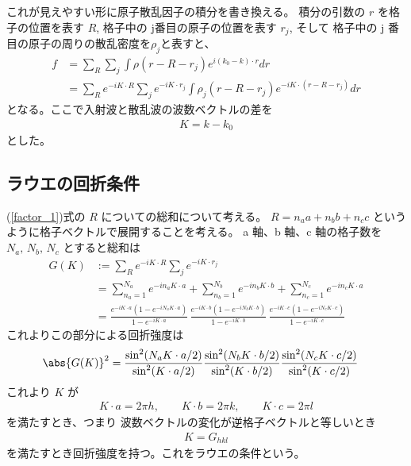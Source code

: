 \documentclass[11pt,dvipdfmx,a4paper]{jsarticle}
\begin{document}
これが見えやすい形に原子散乱因子の積分を書き換える。
積分の引数の \(r\) を格子の位置を表す \(R\), 格子中の j番目の原子の位置を表す \(r_j\), そして
格子中の j 番目の原子の周りの散乱密度を\(\rho_j\)と表すと、
\begin{align}
	f&=\sum_R \sum_{j} \int\rho(r-R-r_j)e^{i(k_0-k)\cdot r} dr\\
	&=\sum_R e^{-iK\cdot R}\sum_j e^{-iK\cdot r_j} \int \rho_j(r-R-r_j) e^{-iK\cdot(r-R-r_j)}dr\label{factor_1}
\end{align}
となる。ここで入射波と散乱波の波数ベクトルの差を
\begin{align}
	K = k -k_0
\end{align}
とした。

\subsection{ラウエの回折条件}
(\ref{factor_1})式の \(R\) についての総和について考える。
\(R = n_a a + n_b b + n_c c\) というように格子ベクトルで展開することを考える。
a 軸、b 軸、c 軸の格子数を\(N_a,\,N_b,\,N_c\) とすると総和は
\begin{align}
	G(K) &:= \sum_R e^{-iK\cdot R}\sum_j e^{-iK\cdot r_j}\\
	&= \sum_{n_a=1}^{N_a} e^{-in_aK\cdot a} + \sum_{n_b=1}^{N_b} e^{-in_bK\cdot b} + \sum_{n_c=1}^{N_c} e^{-in_cK\cdot a}\\
	&=\frac{e^{-iK\cdot a} (1-e^{-iN_a K\cdot a})}{1-e^{-iK\cdot a}}\,
	\frac{e^{-iK\cdot b} (1-e^{-iN_b K\cdot b})}{1-e^{-iK\cdot b}}\,
	\frac{e^{-iK\cdot c} (1-e^{-iN_c K\cdot c})}{1-e^{-iK\cdot c}}
\end{align}
これよりこの部分による回折強度は
\begin{align}
	\abs{G(K)}^2 &= \dfrac{\sin^2(N_a K\cdot a/2)}{\sin^2(K\cdot a/2)}
	\dfrac{\sin^2(N_b K\cdot b/2)}{\sin^2(K\cdot b/2)}
	\dfrac{\sin^2(N_c K\cdot c/2)}{\sin^2(K\cdot c/2)}
\end{align}
これより \(K\) が
\begin{align}
	K\cdot a = 2\pi h, \qquad K\cdot b =2\pi k, \qquad K\cdot c =2\pi l
\end{align}
を満たすとき、つまり 波数ベクトルの変化が逆格子ベクトルと等しいとき
\begin{align}
	K = G_{hkl}
\end{align}
を満たすとき回折強度を持つ。これをラウエの条件という。
\end{document}

